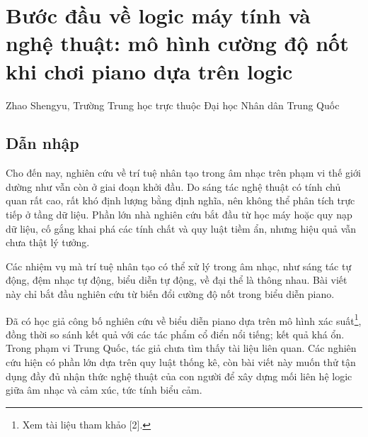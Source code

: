 \documentclass[11pt]{article}
\begin{document}
\section{Bước đầu về logic máy tính và nghệ thuật: mô hình cường độ nốt khi
chơi piano dựa trên logic}

\begin{center}
Zhao Shengyu, Trường Trung học trực thuộc Đại học Nhân dân Trung Quốc
\end{center}

\renewcommand{\abstractname}{Tóm tắt}
\begin{abstract}
Bài viết này bước vào lĩnh vực trí tuệ nhân tạo và nghệ thuật, đưa ra và hiện
thực một thuật toán xác định cường độ cho nốt nhạc, nhằm thu được một phương
án chơi piano có khả năng biểu cảm. Dựa trên kinh nghiệm chơi piano và sáng
tác của tác giả, bài viết thử xây dựng mối liên hệ logic giữa âm nhạc và cảm
xúc, hay tính biểu cảm, rồi phân tích mối liên hệ ấy, đưa ra một loạt tính
chất và định nghĩa có tính sáng tạo. Lấy đó làm mô hình, thông qua cấu trúc
đoạn nhạc phức hợp và cấu trúc giai điệu phức hợp giả định, bài viết hiện
thực một thuật toán xây dựng tối ưu. So với các phương pháp thống kê hoặc học
máy thường gặp, thuật toán này đã thể hiện được mức độ không bị ràng buộc khá
tốt. Bài viết kỳ vọng có thể gợi ra triển vọng phát triển dựa trên nhận thức
của trí tuệ nhân tạo trong hướng nghệ thuật.
\end{abstract}

\subsection{Dẫn nhập}

Cho đến nay, nghiên cứu về trí tuệ nhân tạo trong âm nhạc trên phạm vi thế
giới dường như vẫn còn ở giai đoạn khởi đầu. Do sáng tác nghệ thuật có tính
chủ quan rất cao, rất khó định lượng bằng định nghĩa, nên không thể phân tích
trực tiếp ở tầng dữ liệu. Phần lớn nhà nghiên cứu bắt đầu từ học máy hoặc quy
nạp dữ liệu, cố gắng khai phá các tính chất và quy luật tiềm ẩn, nhưng hiệu
quả vẫn chưa thật lý tưởng.

Các nhiệm vụ mà trí tuệ nhân tạo có thể xử lý trong âm nhạc, như sáng tác tự
động, đệm nhạc tự động, biểu diễn tự động, về đại thể là thông nhau. Bài viết
này chỉ bắt đầu nghiên cứu từ biến đổi cường độ nốt trong biểu diễn piano.

Đã có học giả công bố nghiên cứu về biểu diễn piano dựa trên mô hình xác
suất\footnote{Xem tài liệu tham khảo [2].}, đồng thời so sánh kết quả với các
tác phẩm cổ điển nổi tiếng; kết quả khá ổn. Trong phạm vi Trung Quốc, tác giả
chưa tìm thấy tài liệu liên quan. Các nghiên cứu hiện có phần lớn dựa trên
quy luật thống kê, còn bài viết này muốn thử tận dụng đầy đủ nhận thức nghệ
thuật của con người để xây dựng mối liên hệ logic giữa âm nhạc và cảm xúc,
tức tính biểu cảm.
\end{document}
